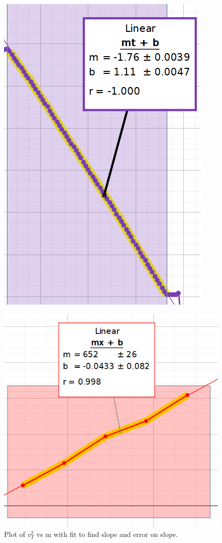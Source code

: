\documentclass[12pt]{article}
\begin{document}
\begin{center}
\begin{figure}[H]
            \includegraphics[height=0.7\textheight]{Figure 2.png}
        \end{figure}
        \begin{figure}[H]
            \captionsetup{justification=centering}
            \caption{Plot of \(v_T^2\) vs m with fit to find slope and error on slope.}
            \includegraphics{Figure 3.png}
        \end{figure}
    \end{center}
\end{document}
